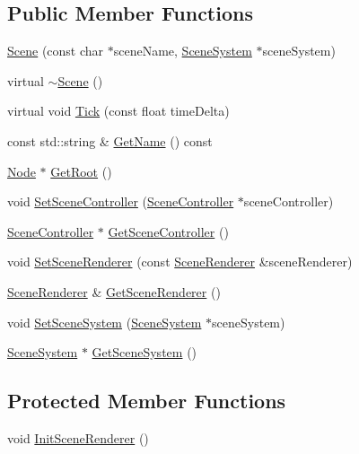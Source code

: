 \subsection*{Public Member Functions}
\begin{DoxyCompactItemize}
\item 
\mbox{\hyperlink{classngl_1_1_scene_ab7c7e8880aab415a752af81e6b76e5d1}{Scene}} (const char $\ast$scene\+Name, \mbox{\hyperlink{classngl_1_1_scene_system}{Scene\+System}} $\ast$scene\+System)
\item 
virtual \mbox{\hyperlink{classngl_1_1_scene_a8f721962cb9d8f2620713512006d2fd6}{$\sim$\+Scene}} ()
\item 
virtual void \mbox{\hyperlink{classngl_1_1_scene_ade4c87e08f19cef04daaef17e9ee4da9}{Tick}} (const float time\+Delta)
\item 
const std\+::string \& \mbox{\hyperlink{classngl_1_1_scene_aca6dc0f87f6695de06a078c5b9d000f4}{Get\+Name}} () const
\item 
\mbox{\hyperlink{classngl_1_1_node}{Node}} $\ast$ \mbox{\hyperlink{classngl_1_1_scene_aae5f39561afdc14da42b0bc0ebf2f270}{Get\+Root}} ()
\item 
void \mbox{\hyperlink{classngl_1_1_scene_af6f6fc6bed3d33b5f73357fee6158c83}{Set\+Scene\+Controller}} (\mbox{\hyperlink{classngl_1_1_scene_controller}{Scene\+Controller}} $\ast$scene\+Controller)
\item 
\mbox{\hyperlink{classngl_1_1_scene_controller}{Scene\+Controller}} $\ast$ \mbox{\hyperlink{classngl_1_1_scene_a652f638c45d60ef09e0df0ab33fdf851}{Get\+Scene\+Controller}} ()
\item 
void \mbox{\hyperlink{classngl_1_1_scene_a578f692547e6f0494cd94c9327558c89}{Set\+Scene\+Renderer}} (const \mbox{\hyperlink{classngl_1_1_scene_renderer}{Scene\+Renderer}} \&scene\+Renderer)
\item 
\mbox{\hyperlink{classngl_1_1_scene_renderer}{Scene\+Renderer}} \& \mbox{\hyperlink{classngl_1_1_scene_aecda519174625f7cf213df39ef1cdb77}{Get\+Scene\+Renderer}} ()
\item 
void \mbox{\hyperlink{classngl_1_1_scene_ae19b6ad3a75bad35434ba5f61fba7ebc}{Set\+Scene\+System}} (\mbox{\hyperlink{classngl_1_1_scene_system}{Scene\+System}} $\ast$scene\+System)
\item 
\mbox{\hyperlink{classngl_1_1_scene_system}{Scene\+System}} $\ast$ \mbox{\hyperlink{classngl_1_1_scene_ace4cd6f47f20e3b41aa4c6c1f88f8d03}{Get\+Scene\+System}} ()
\end{DoxyCompactItemize}
\subsection*{Protected Member Functions}
\begin{DoxyCompactItemize}
\item 
void \mbox{\hyperlink{classngl_1_1_scene_a4bb5b2d94c5a85ed453b8e056282a22d}{Init\+Scene\+Renderer}} ()
\end{DoxyCompactItemize}
